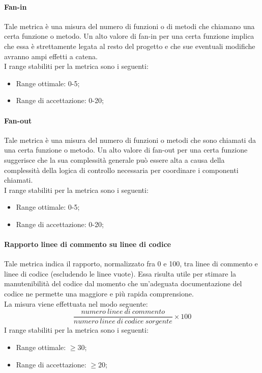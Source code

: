 			\paragraph[Fan-in]{\hypertarget{fi}{Fan-in}}
			Tale metrica è una misura del numero di funzioni o di metodi che chiamano una certa funzione o metodo.
			Un alto valore di fan-in per una certa funzione implica che essa è strettamente legata al resto del progetto e che sue eventuali modifiche avranno ampi effetti a catena.
			\\I range stabiliti per la metrica sono i seguenti:
			\begin{itemize}
				\item Range ottimale: 0-5;
				\item Range di accettazione: 0-20;
			\end{itemize}
			
			\paragraph[Fan-out]{\hypertarget{fo}{Fan-out}}
			Tale metrica è una misura del numero di funzioni o metodi che sono chiamati da una certa funzione o metodo. Un alto valore di fan-out per una certa funzione suggerisce che la sua complessità generale può essere alta a causa della complessità della logica di controllo necessaria per coordinare i componenti chiamati.
			\\I range stabiliti per la metrica sono i seguenti:
			\begin{itemize}
				\item Range ottimale: 0-5;
				\item Range di accettazione: 0-20;
			\end{itemize}
			
			\paragraph[Rapporto linee di commento su linee di codice]{\hypertarget{rlclc}{Rapporto linee di commento su linee di codice}}
			Tale metrica indica il rapporto, normalizzato fra 0 e 100, tra linee di commento e linee di codice (escludendo le linee vuote).
			Essa risulta utile per stimare la manutenibilità del codice dal momento che un'adeguata documentazione del codice ne permette una maggiore e più rapida comprensione.
			\\La misura viene effettuata nel modo seguente:
			\begin{equation}
					\frac{numero~linee~di~commento}{numero~linee~di~codice~sorgente}\times{100}
				\end{equation}
			I range stabiliti per la metrica sono i seguenti:
			\begin{itemize}
				\item Range ottimale: $\geq{30}$;
				\item Range di accettazione: $\geq{20}$;
			\end{itemize}
			
